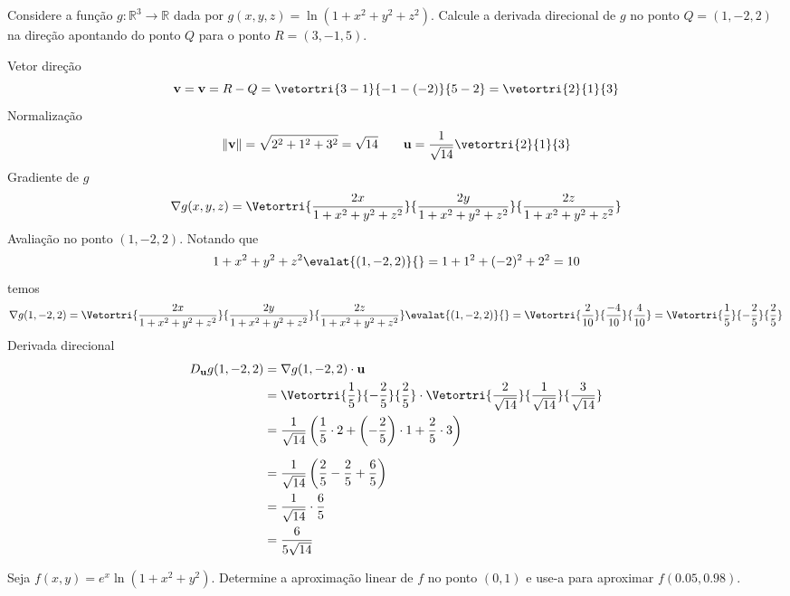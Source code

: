\documentclass[a4paper,12pt,fleqn]{article}
\begin{document}

Considere a função \(g:\mathbb{R}^3\to\mathbb{R}\) dada por
\(
  g(x, y, z)=\ln(1+x^2+y^2+z^2).
\)
Calcule a derivada direcional de \(g\) no ponto  \(Q = (1, -2, 2)\)
na direção apontando do ponto \(Q\) para o ponto \(R = (3, -1, 5)\).

\clearpagequestiononly

\begin{answer}
Vetor direção
\[
  \mathbf{v}
  = \mathbf{v} = R - Q
  = \vetortri{3-1}{-1-(-2)}{5-2}
  = \vetortri{2}{1}{3}
\]
Normalização
\[
  \|\mathbf{v}\|=\sqrt{2^2+1^2+3^2}=\sqrt{14}
  \qquad
  \mathbf{u}=\frac{1}{\sqrt{14}}\vetortri{2}{1}{3}
\]
Gradiente de \(g\)
\[
  \nabla g(x, y, z)
  = \Vetortri{\frac{2x}{1+x^2+y^2+z^2}}
             {\frac{2y}{1+x^2+y^2+z^2}}
             {\frac{2z}{1+x^2+y^2+z^2}}
\]
Avaliação no ponto \((1, -2, 2)\).
Notando que
\[
  1+x^2+y^2+z^2  \evalat{(1, -2, 2)}{}
  = 1 + 1^2 + (-2)^2 + 2^2
  = 10
\]
temos
\[
  \nabla g(1, -2, 2)
  = \Vetortri{\frac{2x}{1+x^2+y^2+z^2}}
             {\frac{2y}{1+x^2+y^2+z^2}}
             {\frac{2z}{1+x^2+y^2+z^2}} \evalat{(1, -2, 2)}{}
  = \Vetortri{\frac{2}{10}}{\frac{-4}{10}}{\frac{4}{10}}
  = \Vetortri{\frac{1}{5}}{-\frac{2}{5}}{\frac{2}{5}}
\]
Derivada direcional
\begin{align*}
  D_{\mathbf{u}}g(1,-2,2)
  & = \nabla g(1,-2,2)\cdot \mathbf{u} \\
  & = \Vetortri{\frac{1}{5}}{-\frac{2}{5}}{\frac{2}{5}}
      \cdot
      \Vetortri{\frac{2}{\sqrt{14}}}{\frac{1}{\sqrt{14}}}{\frac{3}{\sqrt{14}}}\\
  & = \frac{1}{\sqrt{14}}\left(
    \frac{1}{5}\cdot 2
    + \left(-\frac{2}{5}\right)\cdot 1
    + \frac{2}{5}\cdot 3
    \right)\\[6pt]
  &=\frac{1}{\sqrt{14}}\left(
    \frac{2}{5}-\frac{2}{5}+\frac{6}{5}
    \right) \\
  & =\frac{1}{\sqrt{14}}\cdot \frac{6}{5} \\
  & =\frac{6}{5\sqrt{14}}
\end{align*}
\end{answer}

Seja \(f(x,y)=e^{x}\ln(1+x^{2}+y^{2})\). Determine a
aproximação linear de \(f\) no ponto \((0, 1)\) e use-a para aproximar
\(f(0.05, 0.98)\).
\end{document}
